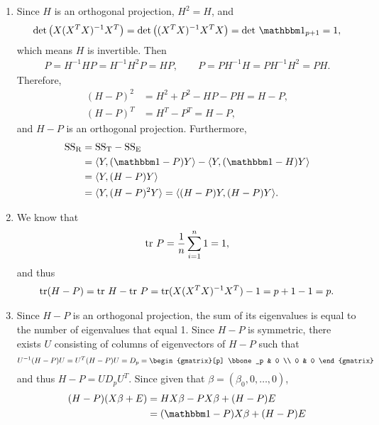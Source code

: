 \begin{enumerate}
	\item Since $H$ is an orthogonal projection, $H^2 = H$, and
	\begin{align*}
	\U{det}\left(X(X^TX)^{-1}X^T \right) = \U{det}\left((X^TX)^{-1} X^TX \right) = \U{det}\ \bbone_{p+1} = 1,
	\end{align*}
	which means $H$ is invertible. Then
	\begin{align*}
	P = H^{-1} HP = H^{-1}H^2 P = HP, \qquad P = PH^{-1}H = PH^{-1}H^2 = PH.
	\end{align*}
	Therefore,
	\begin{align*}
	(H-P)^2 & = H^2 + P^2 - HP - PH = H - P, \\
	(H-P)^T & = H^T - P^T = H - P,
	\end{align*}
	and $H-P$ is an orthogonal projection. Furthermore,
	\begin{align*}
	\U{SS_R} & = \U{SS_T} - \U{SS_E} \\
	& = \langle Y, (\bbone - P)Y\rangle - \langle Y, (\bbone - H)Y\rangle \\
	& = \langle Y, (H - P) Y\rangle \\
	& = \langle Y, (H-P)^2 Y\rangle = \langle (H-P)Y, (H-P)Y \rangle.
	\end{align*}
	\item We know that
	\begin{align*}
	\mathrm{tr}\ P = \frac{1}{n} \sum_{i=1}^n 1 = 1,
	\end{align*}
	and thus
	\begin{align*}
	\mathrm{tr}(H-P) = \mathrm{tr}\ H - \mathrm{tr}\ P = \mathrm{tr}(X(X^TX)^{-1}X^T) - 1 = p + 1 - 1 = p.
	\end{align*}
	\item Since $H - P$ is an orthogonal projection, the sum of its eigenvalues is equal to the number of eigenvalues that equal 1. Since $H - P$ is symmetric, there exists $U$ consisting of columns of eigenvectors of $H-P$ such that
	\begin{align*}
	U^{-1}(H-P)U = U^T(H - P)U = D_{p} = \begin{gmatrix}[p]
	\bbone_p & 0 \\
	0 & 0
	\end{gmatrix}
	\end{align*}
	and thus $H - P = UD_pU^T$. Since given that $\beta = (\beta_0, 0, \ldots, 0)$,
	\begin{align*}
	(H-P)(X\beta + E) & = HX\beta - PX\beta + (H-P)E \\
	& = (\bbone - P)X\beta + (H-P)E \\

\end{align*}
\end{enumerate}
